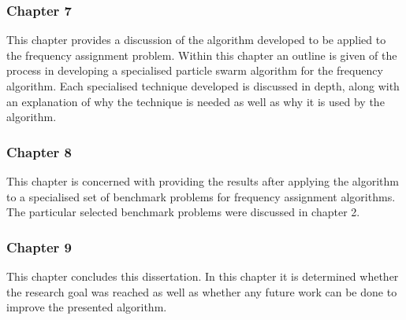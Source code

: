\subsubsection{Chapter 7}
This chapter provides a discussion of the algorithm developed to be applied to the frequency assignment problem. Within this chapter an outline is given of the process in developing a specialised particle swarm algorithm for the frequency algorithm. Each specialised technique developed is discussed in depth, along with an explanation of why the technique is needed as well as why it is used by the algorithm.
\subsubsection{Chapter 8}
This chapter is concerned with providing the results after applying the algorithm to a specialised set of benchmark problems for frequency assignment algorithms. The particular selected benchmark problems were discussed in chapter 2.
\subsubsection{Chapter 9}
This chapter concludes this dissertation. In this chapter it is determined whether the research goal was reached as well as whether any future work can be done to improve the presented algorithm.
